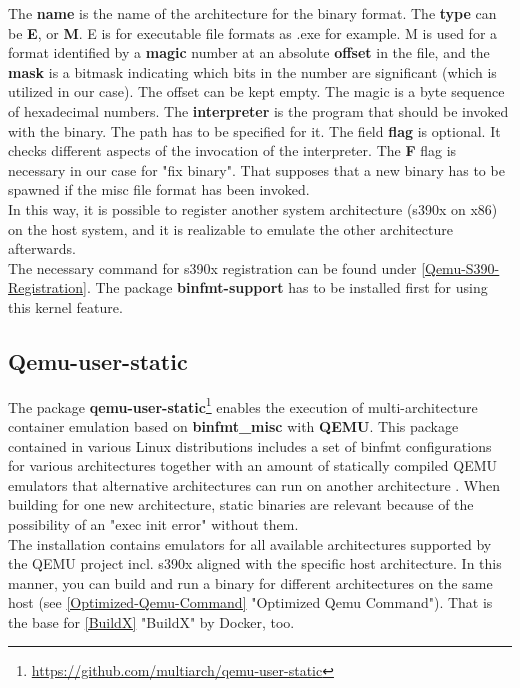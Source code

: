 The \textbf{name} is the name of the architecture for the binary format. The \textbf{type} can be \textbf{E}, or \textbf{M}. E is for executable file formats as .exe for example. M is used for a format identified by a \textbf{magic} number at an absolute \textbf{offset} in the file, and the \textbf{mask} is a bitmask indicating which bits in the number are significant\cite{Slackware2020} (which is utilized in our case). 
The offset can be kept empty. The magic is a byte sequence of hexadecimal numbers. The \textbf{interpreter} is the program that should be invoked with the binary\cite{Guenther2020}. 
The path has to be specified for it. The field \textbf{flag} is optional. It checks different aspects of the invocation of the interpreter. The \textbf{F} flag is necessary in our case for "fix binary". 
That supposes that a new binary has to be spawned if the misc file format has been invoked.\\
In this way, it is possible to register another system architecture (s390x on x86) on the host system, and it is realizable to emulate the other architecture afterwards. \\
The necessary command for s390x registration can be found under \ref{Qemu-S390-Registration}.
The package \textbf{binfmt-support} has to be installed first for using this kernel feature. 

\subsection{Qemu-user-static}\label{qemu-user-static}

The package \textbf{qemu-user-static}\footnote{\url{https://github.com/multiarch/qemu-user-static}} enables the execution of multi-architecture container emulation based on \textbf{binfmt\_misc} with \textbf{QEMU}. This package contained in various Linux distributions includes a set of binfmt configurations for various architectures together with an amount of statically compiled QEMU emulators that alternative architectures can run on another architecture \cite{Yang2019}. When building for one new architecture, static binaries are relevant because of the possibility of an "exec init error" without them. \\
The installation contains emulators for all available architectures supported by the QEMU project incl. s390x aligned with the specific host architecture. In this manner, you can build and run a binary for different architectures on the same host (see \ref{Optimized-Qemu-Command} "Optimized Qemu Command"). That is the base for \ref{BuildX} "BuildX" by Docker, too.

